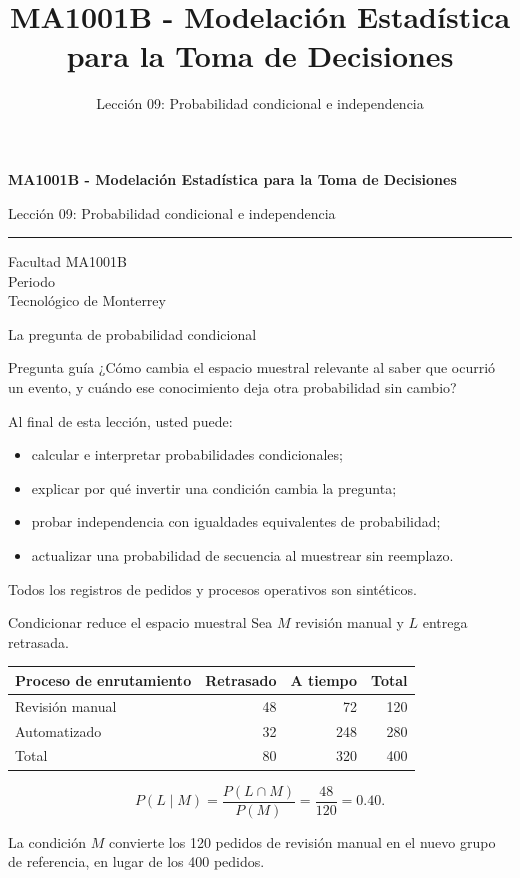\documentclass[aspectratio=169,10pt,spanish]{beamer}
\title{MA1001B - Modelación Estadística para la Toma de Decisiones}
\subtitle{Lección 09: Probabilidad condicional e independencia}
\author{}
\institute{Tecnol\'ogico de Monterrey}
\date{}
\begin{document}
\begin{frame}[plain]
  \vspace{1.2cm}
  {\Large\bfseries MA1001B - Modelación Estadística para la Toma de Decisiones\par}
  \vspace{0.7cm}
  {\large Lección 09: Probabilidad condicional e independencia\par}
  \vspace{0.7cm}
  {\color{TecRojo}\rule{\textwidth}{1.2pt}}
  \vspace{0.8cm}

  Facultad MA1001B\\[0.3cm]
  Periodo\\[0.3cm]
  Tecnol\'ogico de Monterrey
\end{frame}

\begin{frame}{La pregunta de probabilidad condicional}
  \begin{alertblock}{Pregunta guía}
    ¿Cómo cambia el espacio muestral relevante al saber que ocurrió un evento,
    y cuándo ese conocimiento deja otra probabilidad sin cambio?
  \end{alertblock}

  \vspace{0.4em}
  Al final de esta lección, usted puede:
  \begin{itemize}
    \item calcular e interpretar probabilidades condicionales;
    \item explicar por qué invertir una condición cambia la pregunta;
    \item probar independencia con igualdades equivalentes de probabilidad;
    \item actualizar una probabilidad de secuencia al muestrear sin reemplazo.
  \end{itemize}

  \vfill
  \scriptsize Todos los registros de pedidos y procesos operativos son sintéticos.
\end{frame}

\begin{frame}{Condicionar reduce el espacio muestral}
  \small
  Sea $M$ revisión manual y $L$ entrega retrasada.

  \begin{center}
    \begin{tabular}{lrrr}
      \toprule
      \textbf{Proceso de enrutamiento} & \textbf{Retrasado} & \textbf{A tiempo} & \textbf{Total} \\
      \midrule
      Revisión manual & 48 & 72 & 120 \\
      Automatizado & 32 & 248 & 280 \\
      \midrule
      Total & 80 & 320 & 400 \\
      \bottomrule
    \end{tabular}
  \end{center}

  \[
    P(L\mid M)=\frac{P(L\cap M)}{P(M)}=\frac{48}{120}=0.40.
  \]

  La condición $M$ convierte los 120 pedidos de revisión manual en el nuevo
  grupo de referencia, en lugar de los 400 pedidos.
\end{frame}
\end{document}
